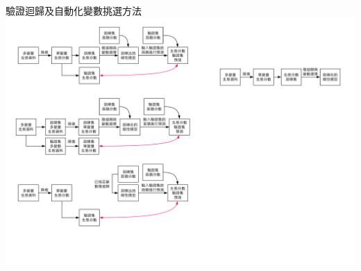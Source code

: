 \documentclass[10pt, aspectratio=1610, xcolor=table]{beamer}
\begin{document}
%
\begin{frame}{驗證迴歸及自動化變數挑選方法}
\centering\includegraphics[width=1\textwidth]{diagram-驗證迴歸及自動化變數挑選方法.pdf}

\end{frame}
\end{document}
